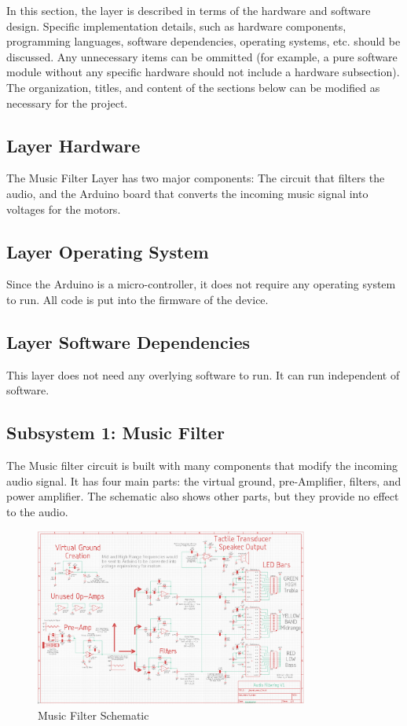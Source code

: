 In this section, the layer is described in terms of the hardware and software design. Specific implementation details, such as hardware components, programming languages, software dependencies, operating systems, etc. should be discussed. Any unnecessary items can be ommitted (for example, a pure software module without any specific hardware should not include a hardware subsection). The organization, titles, and content of the sections below can be modified as necessary for the project.

\subsection{Layer Hardware}
The Music Filter Layer has two major components: The circuit that filters the audio, and the Arduino board that converts the incoming music signal into voltages for the motors.

\subsection{Layer Operating System}
Since the Arduino is a micro-controller, it does not require any operating system to run. All code is put into the firmware of the device.

\subsection{Layer Software Dependencies}
This layer does not need any overlying software to run. It can run independent of software.

\subsection{Subsystem 1: Music Filter}
The Music filter circuit is built with many components that modify the incoming audio signal. It has four main parts: the virtual ground, pre-Amplifier, filters, and power amplifier. The schematic also shows other parts, but they provide no effect to the audio. 

\begin{figure}[h!]
	\centering
 	\includegraphics[width=0.8\textwidth]{images/audio_sch}
 \caption{Music Filter Schematic}
\end{figure}

